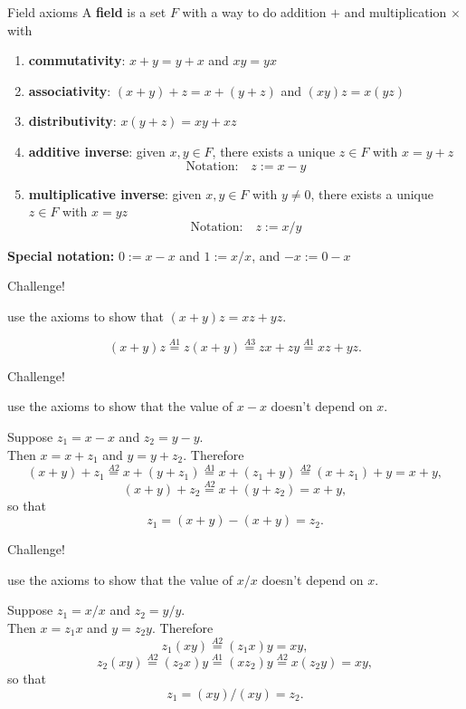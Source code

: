 \documentclass{beamer}
\begin{document}
\begin{frame}{Field axioms}
A \textbf{field} is a set $F$ with a way to do addition $+$ and multiplication $\times$ with
\begin{enumerate}[\text{A}1]
\pause
\item \textbf{commutativity}: $x+y = y+x$ and $xy=yx$
\pause
\item \textbf{associativity}: $(x+y) + z = x + (y+z)$ and $(xy)z = x(yz)$
\pause
\item \textbf{distributivity}: $x(y + z) = xy + xz$
\pause
\item \textbf{additive inverse}: given $x,y\in F$, there exists a unique $z\in F$ with $x=y+z$
$$\text{Notation:}\quad z := x-y$$
\pause
\item \textbf{multiplicative inverse}: given $x,y\in F$ with $y\neq 0$, there exists a unique $z\in F$ with $x = yz$
$$\text{Notation:}\quad z := x/y$$
\end{enumerate}
\pause
\textbf{Special notation:} $0:= x-x$ and $1:= x/x$, and $-x := 0-x$
\end{frame}

\begin{frame}{Challenge!}
\begin{prob}
use the axioms to show that $(x+y)z = xz + yz$.
\end{prob}
\pause
\begin{soln}
$$(x+y)z \stackrel{A1}{=} z(x+y) \stackrel{A3}{=} zx + zy \stackrel{A1}{=} xz + yz.$$
\end{soln}
\end{frame}

\begin{frame}{Challenge!}
\begin{prob}
use the axioms to show that the value of $x-x$ doesn't depend on $x$.
\end{prob}
\pause
\begin{soln}
Suppose $z_1=x-x$ and $z_2=y-y$.\\
\pause
Then $x = x+z_1$ and $y=y+z_2$.  
\pause
Therefore
$$(x+y)+z_1\stackrel{A2}{=}x+(y+z_1)\stackrel{A1}{=}x+(z_1+y)\stackrel{A2}{=}(x+z_1) + y=x+y,$$
\pause
$$(x+y)+z_2\stackrel{A2}{=}x+(y+z_2)=x+y,$$
\pause
so that
$$z_1 = (x+y)-(x+y) = z_2.$$
\end{soln}
\end{frame}

\begin{frame}{Challenge!}
\begin{prob}
use the axioms to show that the value of $x/x$ doesn't depend on $x$.
\end{prob}
\pause
\begin{soln}
Suppose $z_1=x/x$ and $z_2=y/y$.\\
\pause
Then $x = z_1x$ and $y=z_2y$.  
\pause
Therefore
$$z_1(xy) \stackrel{A2}{=} (z_1x)y = xy,$$
\pause
$$z_2(xy) \stackrel{A2}{=} (z_2x)y \stackrel{A1}{=} (xz_2)y \stackrel{A2}{=} x(z_2y) = xy,$$
\pause
so that
$$z_1 = (xy)/(xy) = z_2.$$
\end{soln}
\end{frame}
\end{document}
